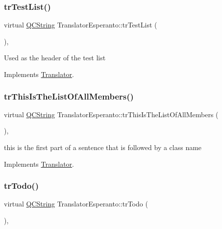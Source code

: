 \subsubsection{\texorpdfstring{trTestList()}{trTestList()}}
{\footnotesize\ttfamily virtual \mbox{\hyperlink{class_q_c_string}{Q\+C\+String}} Translator\+Esperanto\+::tr\+Test\+List (\begin{DoxyParamCaption}{ }\end{DoxyParamCaption})\hspace{0.3cm}{\ttfamily [inline]}, {\ttfamily [virtual]}}

Used as the header of the test list 

Implements \mbox{\hyperlink{class_translator}{Translator}}.

\mbox{\label{class_translator_esperanto_a4ef06f65207704a83291152c38f06659}} 
\subsubsection{\texorpdfstring{trThisIsTheListOfAllMembers()}{trThisIsTheListOfAllMembers()}}
{\footnotesize\ttfamily virtual \mbox{\hyperlink{class_q_c_string}{Q\+C\+String}} Translator\+Esperanto\+::tr\+This\+Is\+The\+List\+Of\+All\+Members (\begin{DoxyParamCaption}{ }\end{DoxyParamCaption})\hspace{0.3cm}{\ttfamily [inline]}, {\ttfamily [virtual]}}

this is the first part of a sentence that is followed by a class name 

Implements \mbox{\hyperlink{class_translator}{Translator}}.

\mbox{\label{class_translator_esperanto_acfd25371a763020fa716e1a5c6aa0d80}} 
\subsubsection{\texorpdfstring{trTodo()}{trTodo()}}
{\footnotesize\ttfamily virtual \mbox{\hyperlink{class_q_c_string}{Q\+C\+String}} Translator\+Esperanto\+::tr\+Todo (\begin{DoxyParamCaption}{ }\end{DoxyParamCaption})\hspace{0.3cm}{\ttfamily [inline]}, {\ttfamily [virtual]}}

